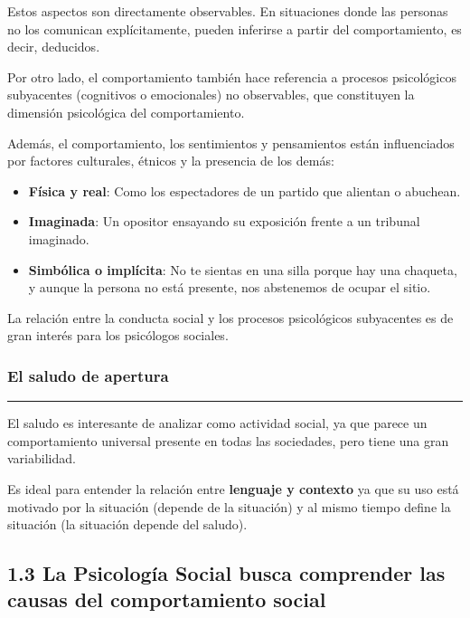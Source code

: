 \documentclass[
]{website}
\providecommand{\tightlist}{%
  \setlength{\itemsep}{0pt}\setlength{\parskip}{0pt}}
\begin{document}
Estos aspectos son directamente observables. En situaciones donde las personas no los comunican explícitamente, pueden inferirse a partir del comportamiento, es decir, deducidos.

Por otro lado, el comportamiento también hace referencia a procesos psicológicos subyacentes (cognitivos o emocionales) no observables, que constituyen la dimensión psicológica del comportamiento.

Además, el comportamiento, los sentimientos y pensamientos están influenciados por factores culturales, étnicos y la presencia de los demás:

\begin{itemize}
\tightlist
\item
  \textbf{Física y real}: Como los espectadores de un partido que alientan o abuchean.
\item
  \textbf{Imaginada}: Un opositor ensayando su exposición frente a un tribunal imaginado.
\item
  \textbf{Simbólica o implícita}: No te sientas en una silla porque hay una chaqueta, y aunque la persona no está presente, nos abstenemos de ocupar el sitio.
\end{itemize}

La relación entre la conducta social y los procesos psicológicos subyacentes es de gran interés para los psicólogos sociales.

\subsubsection*{El saludo de apertura}\label{cuadro1_2_1}

\begin{center}\rule{0.5\linewidth}{0.5pt}\end{center}

El saludo es interesante de analizar como actividad social, ya que parece un comportamiento universal presente en todas las sociedades, pero tiene una gran variabilidad.

Es ideal para entender la relación entre \textbf{lenguaje y contexto} ya que su uso está motivado por la situación (depende de la situación) y al mismo tiempo define la situación (la situación depende del saludo).

\subsection*{1.3 La Psicología Social busca comprender las causas del comportamiento social}\label{subtema1_3}
\end{document}
